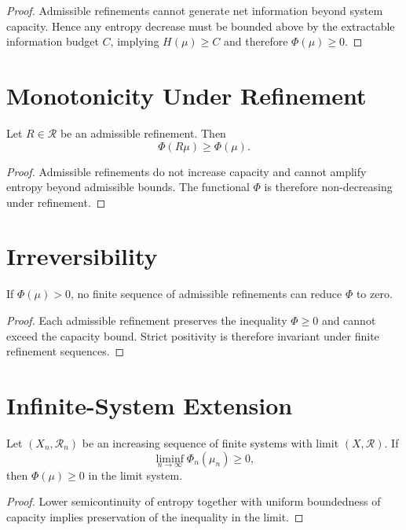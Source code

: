 \begin{proof}
Admissible refinements cannot generate net information beyond system capacity. Hence any entropy decrease must be bounded above by the extractable information budget $C$, implying $H(\mu) \ge C$ and therefore $\Phi(\mu) \ge 0$.
\end{proof}

\section{Monotonicity Under Refinement}

\begin{theorem}
Let $R \in \mathcal{R}$ be an admissible refinement. Then
\[
\Phi(R\mu) \ge \Phi(\mu).
\]
\end{theorem}

\begin{proof}
Admissible refinements do not increase capacity and cannot amplify entropy beyond admissible bounds. The functional $\Phi$ is therefore non-decreasing under refinement.
\end{proof}

\section{Irreversibility}

\begin{theorem}
If $\Phi(\mu) > 0$, no finite sequence of admissible refinements can reduce $\Phi$ to zero.
\end{theorem}

\begin{proof}
Each admissible refinement preserves the inequality $\Phi \ge 0$ and cannot exceed the capacity bound. Strict positivity is therefore invariant under finite refinement sequences.
\end{proof}

\section{Infinite-System Extension}

\begin{theorem}
Let $(X_n,\mathcal{R}_n)$ be an increasing sequence of finite systems with limit $(X,\mathcal{R})$. If
\[
\liminf_{n\to\infty} \Phi_n(\mu_n) \ge 0,
\]
then $\Phi(\mu) \ge 0$ in the limit system.
\end{theorem}

\begin{proof}
Lower semicontinuity of entropy together with uniform boundedness of capacity implies preservation of the inequality in the limit.
\end{proof}
